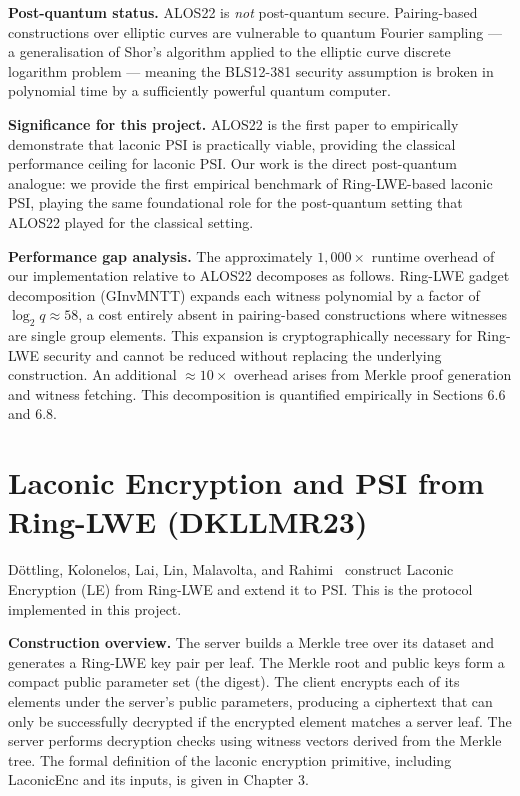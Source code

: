 \textbf{Post-quantum status.} ALOS22 is \textit{not} post-quantum secure.
Pairing-based constructions over elliptic curves are vulnerable to quantum Fourier
sampling --- a generalisation of Shor's algorithm applied to the elliptic curve
discrete logarithm problem --- meaning the BLS12-381 security assumption is broken
in polynomial time by a sufficiently powerful quantum computer.

\textbf{Significance for this project.} ALOS22 is the first paper to empirically
demonstrate that laconic PSI is practically viable, providing the classical
performance ceiling for laconic PSI. Our work is the direct post-quantum analogue:
we provide the first empirical benchmark of Ring-LWE-based laconic PSI, playing
the same foundational role for the post-quantum setting that ALOS22 played for
the classical setting.

\textbf{Performance gap analysis.} The approximately $1{,}000\times$ runtime overhead
of our implementation relative to ALOS22 decomposes as follows. Ring-LWE gadget
decomposition (GInvMNTT) expands each witness polynomial by a factor of
$\log_2 q \approx 58$, a cost entirely absent in pairing-based constructions
where witnesses are single group elements. This expansion is cryptographically
necessary for Ring-LWE security and cannot be reduced without replacing the
underlying construction. An additional $\approx 10\times$ overhead arises from
Merkle proof generation and witness fetching. This decomposition is quantified
empirically in Sections 6.6 and 6.8.

\section{Laconic Encryption and PSI from Ring-LWE (DKLLMR23)}

D\"{o}ttling, Kolonelos, Lai, Lin, Malavolta, and Rahimi~\cite{dottling2023efficient}
construct Laconic Encryption (LE) from Ring-LWE and extend it to PSI. This is
the protocol implemented in this project.

\textbf{Construction overview.} The server builds a Merkle tree over its dataset
and generates a Ring-LWE key pair per leaf. The Merkle root and public keys form
a compact public parameter set (the digest). The client encrypts each of its
elements under the server's public parameters, producing a ciphertext that can
only be successfully decrypted if the encrypted element matches a server leaf.
The server performs decryption checks using witness vectors derived from the Merkle
tree. The formal definition of the laconic encryption primitive, including
\textsf{LaconicEnc} and its inputs, is given in Chapter 3.

